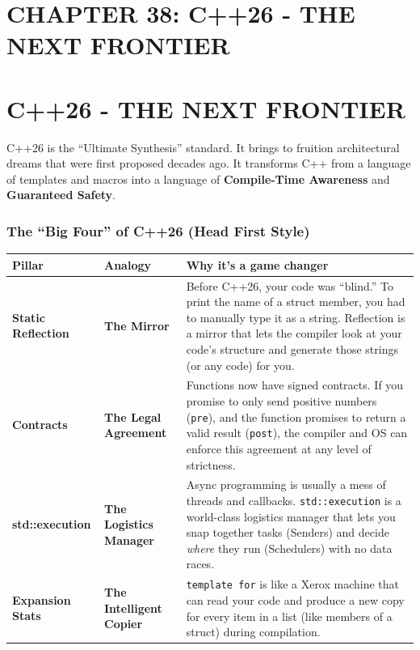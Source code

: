 \hypertarget{chapter-38-c26---the-next-frontier}{%
\section{CHAPTER 38: C++26 - THE NEXT
FRONTIER}\label{chapter-38-c26---the-next-frontier}}

\hypertarget{c26---the-next-frontier}{%
\section{C++26 - THE NEXT FRONTIER}\label{c26---the-next-frontier}}

C++26 is the ``Ultimate Synthesis'' standard. It brings to fruition
architectural dreams that were first proposed decades ago. It transforms
C++ from a language of templates and macros into a language of
\textbf{Compile-Time Awareness} and \textbf{Guaranteed Safety}.

\hypertarget{the-big-four-of-c26-head-first-style}{%
\subsubsection{The ``Big Four'' of C++26 (Head First
Style)}\label{the-big-four-of-c26-head-first-style}}

\begin{longtable}[]{@{}
  >{\raggedright\arraybackslash}p{}
  >{\raggedright\arraybackslash}p{}
  >{\raggedright\arraybackslash}p{}@{}}
\toprule
Pillar & Analogy & Why it's a game changer \\
\midrule
\endhead
\textbf{Static Reflection} & \textbf{The Mirror} & Before C++26, your
code was ``blind.'' To print the name of a struct member, you had to
manually type it as a string. Reflection is a mirror that lets the
compiler look at your code's structure and generate those strings (or
any code) for you. \\
\textbf{Contracts} & \textbf{The Legal Agreement} & Functions now have
signed contracts. If you promise to only send positive numbers
(\passthrough{\lstinline!pre!}), and the function promises to return a
valid result (\passthrough{\lstinline!post!}), the compiler and OS can
enforce this agreement at any level of strictness. \\
\textbf{std::execution} & \textbf{The Logistics Manager} & Async
programming is usually a mess of threads and callbacks.
\passthrough{\lstinline!std::execution!} is a world-class logistics
manager that lets you snap together tasks (Senders) and decide
\emph{where} they run (Schedulers) with no data races. \\
\textbf{Expansion Stats} & \textbf{The Intelligent Copier} &
\passthrough{\lstinline!template for!} is like a Xerox machine that can
read your code and produce a new copy for every item in a list (like
members of a struct) during compilation. \\
\bottomrule
\end{longtable}

